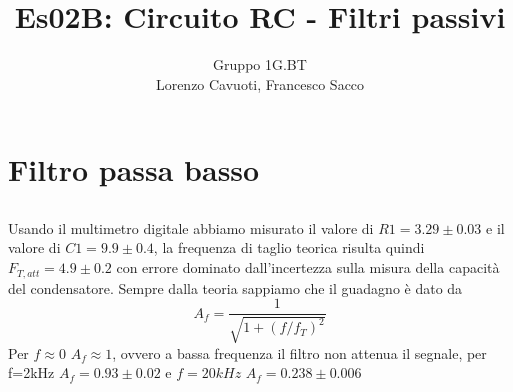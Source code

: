 \documentclass[10pt,a4paper]{article}
\author{Gruppo 1G.BT \\ Lorenzo Cavuoti, Francesco Sacco}
\title{Es02B: Circuito RC - Filtri passivi}
\begin{document}
\maketitle

\section{Filtro passa basso}
	\subsection{}
	Usando il multimetro digitale abbiamo misurato il valore di $R1=3.29\pm 0.03$
	e il valore di $C1=9.9\pm 0.4$, la frequenza di taglio teorica risulta quindi
	$F_{T,att}=4.9\pm 0.2$ con errore dominato dall'incertezza sulla misura della
	capacità del condensatore. Sempre dalla teoria sappiamo che il guadagno è
	dato da
	\begin{equation}
	    A_f = \frac{1}{\sqrt{1+(f/f_T)^2}}
	\end{equation}
	Per $f\approx0$ $A_f\approx1$, ovvero a bassa frequenza il filtro non attenua 	il segnale, per f=2kHz $A_f=0.93\pm0.02$ e $f=20kHz$ $A_f=0.238\pm0.006$
\end{document}
